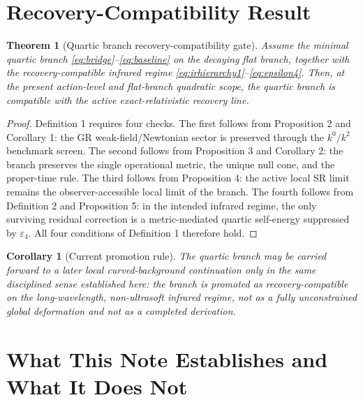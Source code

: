 \documentclass[11pt]{article}
\newtheorem{corollary}{Corollary}
\newtheorem{theorem}{Theorem}
\begin{document}
\section{Recovery-Compatibility Result}

\begin{theorem}[Quartic branch recovery-compatibility gate]
Assume the minimal quartic branch \eqref{eq:bridge}--\eqref{eq:baseline} on the decaying flat branch, together with the recovery-compatible infrared regime \eqref{eq:irhierarchy1}--\eqref{eq:epsilon4}. Then, at the present action-level and flat-branch quadratic scope, the quartic branch is compatible with the active exact-relativistic recovery line.
\end{theorem}

\begin{proof}
Definition 1 requires four checks. The first follows from Proposition 2 and Corollary 1: the GR weak-field/Newtonian sector is preserved through the \(k^0/k^2\) benchmark screen. The second follows from Proposition 3 and Corollary 2: the branch preserves the single operational metric, the unique null cone, and the proper-time rule. The third follows from Proposition 4: the active local SR limit remains the observer-accessible local limit of the branch. The fourth follows from Definition 2 and Proposition 5: in the intended infrared regime, the only surviving residual correction is a metric-mediated quartic self-energy suppressed by \(\varepsilon_4\). All four conditions of Definition 1 therefore hold.
\end{proof}

\begin{corollary}[Current promotion rule]
The quartic branch may be carried forward to a later local curved-background continuation only in the same disciplined sense established here: the branch is promoted as recovery-compatible on the long-wavelength, non-ultrasoft infrared regime, not as a fully unconstrained global deformation and not as a completed derivation.
\end{corollary}

\section{What This Note Establishes and What It Does Not}
\end{document}
